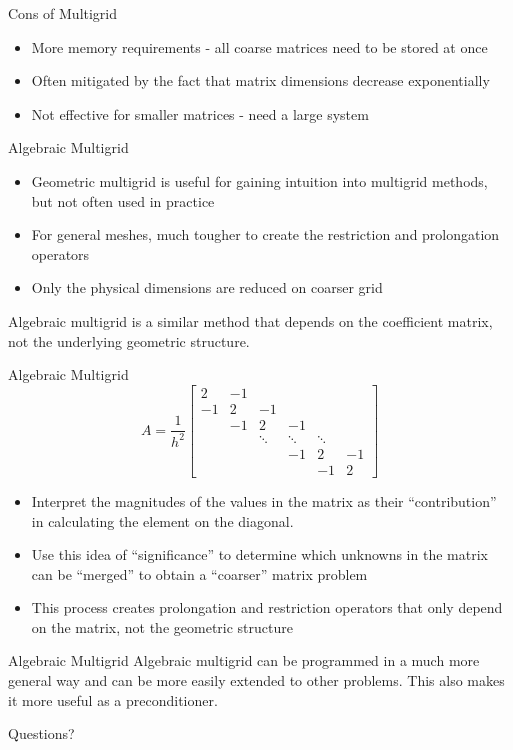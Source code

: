 \documentclass[11pt]{beamer}
\begin{document}
  \begin{frame}{Cons of Multigrid}
    \begin{itemize}
      \item More memory requirements - all coarse matrices need to be stored at
        once
      \item Often mitigated by the fact that matrix dimensions decrease
        exponentially
      \item Not effective for smaller matrices - need a large system
    \end{itemize}
  \end{frame}
  \begin{frame}{Algebraic Multigrid}
    \begin{itemize}
    \item Geometric multigrid is useful for gaining intuition into multigrid
      methods, but not often used in practice
    \item For general meshes, much tougher to create the restriction and
      prolongation operators
    \item Only the physical dimensions are reduced on coarser grid
    \end{itemize}
    \vspace{.2in}
    Algebraic multigrid is a similar method that depends on the coefficient
    matrix, not the underlying geometric structure.
  \end{frame}
  \begin{frame}{Algebraic Multigrid}
    \begin{equation*}
      A = \frac{1}{h^2}
      \begin{bmatrix}
        2  & -1 &        &        &        &   \\
        -1 &  2 & -1     &        &        &   \\
        & -1 &  2     &     -1 &        &   \\
        &    & \ddots & \ddots & \ddots &   \\
        &    &        &     -1 &      2 & -1 \\
        &    &        &        &     -1 &  2
      \end{bmatrix}
    \end{equation*}
    \begin{itemize}
    \item Interpret the magnitudes of the values in the matrix as their ``contribution''
      in calculating the element on the diagonal.
    \item Use this idea of ``significance'' to determine which unknowns in the
      matrix can be ``merged'' to obtain a ``coarser'' matrix problem
    \item This process creates prolongation and restriction operators that only
      depend on the matrix, not the geometric structure
    \end{itemize}

  \end{frame}
  \begin{frame}{Algebraic Multigrid}
    Algebraic multigrid can be programmed in a much more general way and
    can be more easily extended to other problems.  This also makes it more useful
    as a preconditioner.
  \end{frame}
  \begin{frame}{Questions?}
  \end{frame}
\end{document}
